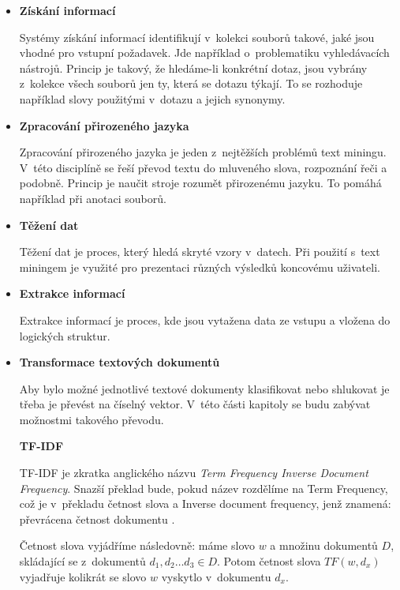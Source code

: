 \documentclass[thesis=M,czech]{FITthesis}[2012/10/20]
\begin{document}
		\begin{itemize} 

		\item \textbf{Získání informací}
		
			Systémy získání informací identifikují v~kolekci souborů takové, jaké jsou vhodné pro vstupní požadavek. Jde například o~problematiku vyhledávacích nástrojů. Princip je takový, že hledáme-li konkrétní dotaz, jsou vybrány z~kolekce všech souborů jen ty, která se dotazu týkají. To se rozhoduje například slovy použitými v~dotazu a jejich synonymy.
		
		\item \textbf{Zpracování přirozeného jazyka}
		
			Zpracování přirozeného jazyka je jeden z~nejtěžších problémů text miningu. V~této disciplíně se řeší převod textu do mluveného slova, rozpoznání řeči a podobně. Princip je naučit stroje rozumět přirozenému jazyku. To pomáhá například při anotaci souborů.
			
		\item \textbf{Těžení dat}
		
			Těžení dat je proces, který hledá skryté vzory v~datech. Při použití s~text miningem je využité pro prezentaci různých výsledků koncovému uživateli.
			
		\item \textbf{Extrakce informací}
		
			Extrakce informací je proces, kde jsou vytažena data ze vstupu a vložena do logických struktur.\cite{SankarSureshTextMining}
		
		
		\item \textbf{Transformace textových dokumentů}
		
		 Aby bylo možné jednotlivé textové dokumenty klasifikovat nebo shlukovat je třeba je převést na číselný vektor. V~této části kapitoly se budu zabývat možnostmi takového převodu.
	
		\textbf{TF-IDF}
			\label{subsub:tf-idf}
			
			TF-IDF je zkratka anglického názvu \textit{Term Frequency Inverse Document Frequency}. Snazší překlad bude, pokud název rozdělíme na Term Frequency, což je v~překladu četnost slova a Inverse document frequency, jenž znamená: převrácena četnost dokumentu \cite{RamosTF-IDF}.
			
			Četnost slova vyjádříme následovně: máme slovo $w$ a množinu dokumentů $D$, skládající se z~dokumentů $d_1, d_2 \ldots d_3 \in D$. Potom četnost slova $TF(w, d_x)$ vyjadřuje kolikrát se slovo $w$ vyskytlo v~dokumentu $d_x$.
			

\end{itemize}
\end{document}

